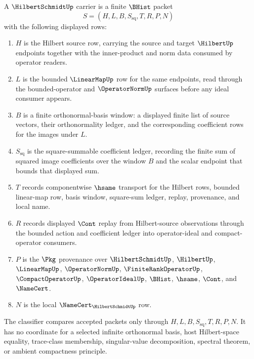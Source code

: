 \begin{definition}
\label{def:hilbert-schmidt-carrier}
A $\HilbertSchmidtUp$ carrier is a finite $\BHist$ packet
$$
S=(H,L,B,S_{\mathrm{sq}},T,R,P,N)
$$
with the following displayed rows:
\begin{enumerate}
\item $H$ is the Hilbert source row, carrying the source and target $\HilbertUp$ endpoints together with the inner-product and norm data consumed by operator readers.
\item $L$ is the bounded $\LinearMapUp$ row for the same endpoints, read through the bounded-operator and $\OperatorNormUp$ surfaces before any ideal consumer appears.
\item $B$ is a finite orthonormal-basis window: a displayed finite list of source vectors, their orthonormality ledger, and the corresponding coefficient rows for the images under $L$.
\item $S_{\mathrm{sq}}$ is the square-summable coefficient ledger, recording the finite sum of squared image coefficients over the window $B$ and the scalar endpoint that bounds that displayed sum.
\item $T$ records componentwise $\hsame$ transport for the Hilbert rows, bounded linear-map row, basis window, square-sum ledger, replay, provenance, and local name.
\item $R$ records displayed $\Cont$ replay from Hilbert-source observations through the bounded action and coefficient ledger into operator-ideal and compact-operator consumers.
\item $P$ is the $\Pkg$ provenance over $\HilbertSchmidtUp$, $\HilbertUp$, $\LinearMapUp$, $\OperatorNormUp$, $\FiniteRankOperatorUp$, $\CompactOperatorUp$, $\OperatorIdealUp$, $\BHist$, $\hsame$, $\Cont$, and $\NameCert$.
\item $N$ is the local $\NameCert_{\HilbertSchmidtUp}$ row.
\end{enumerate}
The classifier compares accepted packets only through $H,L,B,S_{\mathrm{sq}},T,R,P,N$. It has no coordinate for a selected infinite orthonormal basis, host Hilbert-space equality, trace-class membership, singular-value decomposition, spectral theorem, or ambient compactness principle.
\end{definition}

